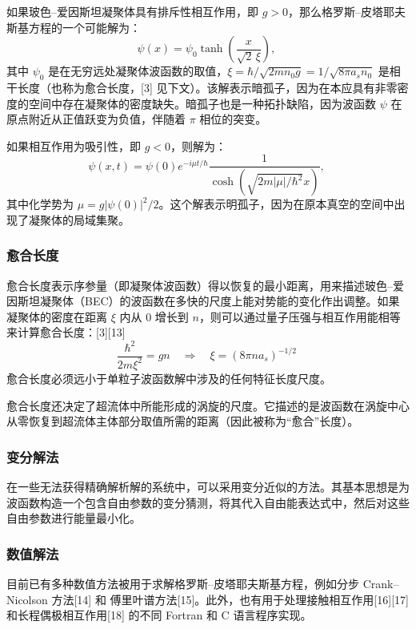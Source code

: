 如果玻色–爱因斯坦凝聚体具有排斥性相互作用，即 $g > 0$，那么格罗斯–皮塔耶夫斯基方程的一个可能解为：
$$
\psi(x) = \psi_0 \tanh\left( \frac{x}{\sqrt{2} \, \xi} \right),~
$$
其中 $\psi_0$ 是在无穷远处凝聚体波函数的取值，$\xi = \hbar/\sqrt{2 m n_0 g} = 1/\sqrt{8\pi a_s n_0}$ 是相干长度（也称为愈合长度，[3] 见下文）。该解表示暗孤子，因为在本应具有非零密度的空间中存在凝聚体的密度缺失。暗孤子也是一种拓扑缺陷，因为波函数 $\psi$ 在原点附近从正值跃变为负值，伴随着 $\pi$ 相位的突变。

如果相互作用为吸引性，即 $g < 0$，则解为：
$$
\psi(x, t) = \psi(0) e^{-i\mu t / \hbar} \frac{1}{\cosh\left( \sqrt{2m|\mu|/\hbar^2} x \right)},~
$$
其中化学势为 $\mu = g |\psi(0)|^2/2$。这个解表示明孤子，因为在原本真空的空间中出现了凝聚体的局域集聚。
\subsubsection{愈合长度}
愈合长度表示序参量（即凝聚体波函数）得以恢复的最小距离，用来描述玻色–爱因斯坦凝聚体（BEC）的波函数在多快的尺度上能对势能的变化作出调整。如果凝聚体的密度在距离 $\xi$ 内从 0 增长到 $n$，则可以通过量子压强与相互作用能相等来计算愈合长度：[3][13]
$$
\frac{\hbar^2}{2m \xi^2} = gn \quad \Longrightarrow \quad \xi = \left(8\pi n a_s\right)^{-1/2}~
$$
愈合长度必须远小于单粒子波函数解中涉及的任何特征长度尺度。

愈合长度还决定了超流体中所能形成的涡旋的尺度。它描述的是波函数在涡旋中心从零恢复到超流体主体部分取值所需的距离（因此被称为“愈合”长度）。
\subsubsection{变分解法}
在一些无法获得精确解析解的系统中，可以采用变分近似的方法。其基本思想是为波函数构造一个包含自由参数的变分猜测，将其代入自由能表达式中，然后对这些自由参数进行能量最小化。
\subsubsection{数值解法}
目前已有多种数值方法被用于求解格罗斯–皮塔耶夫斯基方程，例如分步 Crank–Nicolson 方法[14] 和 傅里叶谱方法[15]。此外，也有用于处理接触相互作用[16][17] 和长程偶极相互作用[18] 的不同 Fortran 和 C 语言程序实现。
